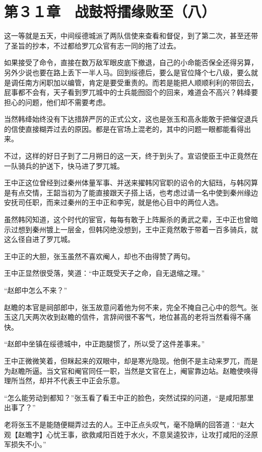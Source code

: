 \section{第３１章　战鼓将擂缘败至（八）}

这一等就是五天，中间绥德城派了两队信使来查看和督促，到了第二次，甚至还带了圣旨的抄本，不过都给罗兀众官有志一同的拖了过去。

如果接受了命令，直接在数万敌军眼皮底下撤退，自己的小命能否保全还得另算，另外少说也要在路上丢下一半人马。回到绥德后，要么是官位降个七八级，要么就是调任南方闲职加以编管，肯定是要受重责的。而若是能把人顺顺利利的带回去，屁事都不会有，天子看到罗兀城中的士兵能囫囵个的回来，难道会不高兴？韩绛要担心的问题，他们却不需要考虑。

当然韩绛始终没有下达措辞严厉的正式公文，这也是张玉和高永能敢于把催促退兵的信使直接糊弄过去的原因。都是在官场上混老的，其中的问题一眼都能看得出来。

不过，这样的好日子到了二月朔日的这一天，终于到头了。宣诏使臣王中正竟然在一队骑兵的护送下，快马进了罗兀城。

王中正这位曾经到过秦州体量军事、并送来擢韩冈官职的诏令的大貂珰，与韩冈算是有点交情，王韶当初为了能直接跟天子搭上话，也考虑过请一名中使到秦州缘边安抚司任职，而来过秦州的王中正和李宪，就是他心目中的两位人选。

虽然韩冈知道，这个时代的宦官，每每有敢于上阵厮杀的勇武之辈，王中正也曾暗示过想到秦州镀上一层金，但韩冈绝没想到，王中正竟然敢于带着一百多骑兵，就这么径自进了罗兀城。

王中正的大胆，张玉虽然不喜欢阉人，却也不由得赞了两句。

王中正显然很受落，笑道：“中正既受天子之命，自无退缩之理。”

“赵郎中怎么不来？”

赵瞻的本官是祠部郎中，张玉故意问着他为何不来，完全不掩自己心中的怨气。张玉这几天两次收到赵瞻的信件，言辞间很不客气，地位甚高的老将当然看得不痛快。

“赵郎中坐镇在绥德城中，中正跑腿惯了，所以受了这件差事来。”

王中正微微笑着，但眯起来的双眼中，却是寒光隐现。他倒不是主动来罗兀，而是为赵瞻所逼。当文官和阉官同任一职，当然是文官在上，阉宦靠边站。赵瞻使唤得理所当然，却并不代表王中正会乐意。

“怎么能劳动到都知？”张玉看了看王中正的脸色，突然试探的问道，“是咸阳那里出事了？”

老将张玉不是能随便糊弄过去的人。王中正点头叹气，毫不隐瞒的回答道：“赵大观【赵瞻字】心忧王事，欲救咸阳百姓于水火，不意吴逵狡诈，让攻打咸阳的泾原军损失不小。”

